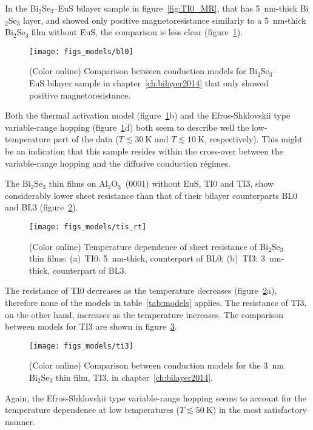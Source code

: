 In the Bi$_2$Se$_3$--EuS bilayer sample in figure~\ref{fig:TI0_MR}, that has \SI{5}{nm}-thick Bi$_2$Se$_3$ layer, and showed only positive magnetoresistance similarly to a \SI{5}{nm}-thick Bi$_2$Se$_3$ film without EuS, the comparison is less clear (figure~\ref{fig:models_bl0}). %
\begin{figure}[ht]%
    \centering%
    \texttt{[image: figs\_models/bl0]}%
    \caption[Conduction model comparison: Bi$_2$Se$_3$--EuS bilayer: BL0]{\label{fig:models_bl0}(Color online) Comparison between conduction models for Bi$_2$Se$_3$--EuS bilayer sample in chapter~\ref{ch:bilayer2014} that only showed positive magnetoresistance.}%
\end{figure}%
%
Both the thermal activation model (figure~\ref{fig:models_bl0}b) and the Efros-Shklovskii type variable-range hopping (figure~\ref{fig:models_bl0}d) both seem to describe well the low-temperature part of the data ($T \lesssim 30~\mathrm{K}$ and $T \lesssim 10~\mathrm{K}$, respectively). This might be an indication that this sample resides within the cross-over between the variable-range hopping and the diffusive conduction r\'egimes.

The Bi$_2$Se$_3$ thin films on Al$_2$O$_3$~(0001) without EuS, TI0 and TI3, show considerably lower sheet resistance than that of their bilayer counterparts BL0 and BL3 (figure~\ref{fig:models_tis_rt}). %
\begin{figure}[h!]%
    \centering%
    \texttt{[image: figs\_models/tis\_rt]}%
    \caption[Temperature dependence of sheet resistance of Bi$_2$Se$_3$ thin films: TI0~\&~TI3]{\label{fig:models_tis_rt}(Color online) Temperature dependence of sheet resistance of Bi$_2$Se$_3$ thin films: (a)~TI0: \SI{5}{nm}-thick, counterpart of BL0; (b)~TI3: \SI{3}{nm}-thick, counterpart of BL3.}%
\end{figure}%
%
The resistance of TI0 decreases as the temperature decreases (figure~\ref{fig:models_tis_rt}a), therefore none of the models in table~\ref{tab:models} applies. The resistance of TI3, on the other hand, increases as the temperature increases. The comparison between models for TI3 are shown in figure~\ref{fig:models_ti3}. %
\begin{figure}[h!]%
    \centering%
    \texttt{[image: figs\_models/ti3]}%
    \caption[Conduction model comparison: Bi$_2$Se$_3$ thin films: TI3]{\label{fig:models_ti3}(Color online) Comparison between conduction models for the \SI{3}{nm} Bi$_2$Se$_3$ thin film, TI3, in chapter~\ref{ch:bilayer2014}.}%
\end{figure}%
%
Again, the Efros-Shklovskii type variable-range hopping seems to account for the temperature dependence at low temperatures ($T \lesssim 50~\mathrm{K}$) in the most satisfactory manner.

